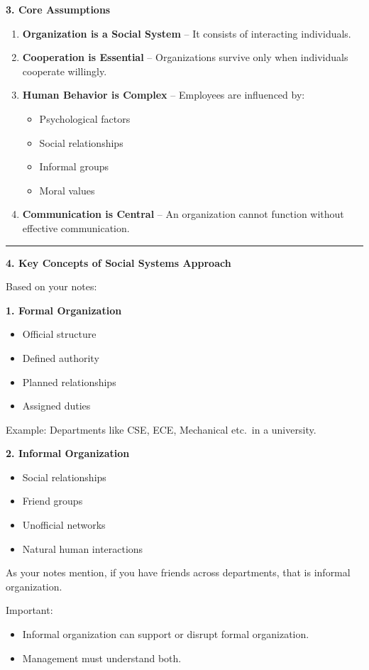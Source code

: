 \documentclass[10pt,a4paper]{article}
\newcommand{\separator}{\vspace{0.4em}\noindent\rule{\linewidth}{0.6pt}\vspace{0.4em}}
\begin{document}
\textbf{3. Core Assumptions}

\begin{enumerate}
  \item \textbf{Organization is a Social System} -- It consists of interacting individuals.
  \item \textbf{Cooperation is Essential} -- Organizations survive only when individuals cooperate willingly.
  \item \textbf{Human Behavior is Complex} -- Employees are influenced by:
    \begin{itemize}
      \item Psychological factors
      \item Social relationships
      \item Informal groups
      \item Moral values
    \end{itemize}
  \item \textbf{Communication is Central} -- An organization cannot function without effective communication.
\end{enumerate}

\separator

\textbf{4. Key Concepts of Social Systems Approach}

Based on your notes:

\textbf{1. Formal Organization}
\begin{itemize}
  \item Official structure
  \item Defined authority
  \item Planned relationships
  \item Assigned duties
\end{itemize}

Example: Departments like CSE, ECE, Mechanical etc.\ in a university.

\textbf{2. Informal Organization}
\begin{itemize}
  \item Social relationships
  \item Friend groups
  \item Unofficial networks
  \item Natural human interactions
\end{itemize}

As your notes mention, if you have friends across departments, that is informal organization.

Important:
\begin{itemize}
  \item Informal organization can support or disrupt formal organization.
  \item Management must understand both.
\end{itemize}
\end{document}
